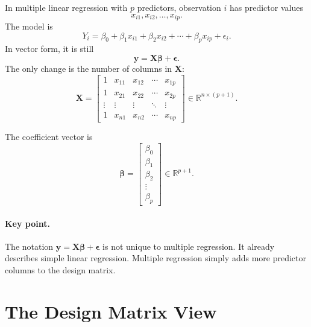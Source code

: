 In multiple linear regression with \(p\) predictors, observation \(i\) has predictor values
\begin{equation}
  x_{i1},x_{i2},\ldots,x_{ip}.
\end{equation}
The model is
\begin{equation}
  Y_i=\beta_0+\beta_1x_{i1}+\beta_2x_{i2}+\cdots+\beta_px_{ip}+\epsilon_i.
\end{equation}
In vector form, it is still
\begin{equation}
  \boxed{\mathbf{y}=\mathbf{X}\boldsymbol{\beta}+\boldsymbol{\epsilon}.}
\end{equation}
The only change is the number of columns in \(\mathbf{X}\):
\begin{equation}
  \mathbf{X}=\begin{bmatrix}
    1 & x_{11} & x_{12} & \cdots & x_{1p}\\
    1 & x_{21} & x_{22} & \cdots & x_{2p}\\
    \vdots & \vdots & \vdots & \ddots & \vdots\\
    1 & x_{n1} & x_{n2} & \cdots & x_{np}
  \end{bmatrix}
  \in \mathbb{R}^{n\times(p+1)}.
\end{equation}

The coefficient vector is
\begin{equation}
  \boldsymbol{\beta}=\begin{bmatrix}
    \beta_0\\\beta_1\\\beta_2\\\vdots\\\beta_p
  \end{bmatrix}
  \in\mathbb{R}^{p+1}.
\end{equation}

\paragraph{Key point.}
The notation \(\mathbf{y}=\mathbf{X}\boldsymbol{\beta}+\boldsymbol{\epsilon}\) is not unique to multiple regression.  It already describes simple linear regression.  Multiple regression simply adds more predictor columns to the design matrix.

\section{The Design Matrix View}

